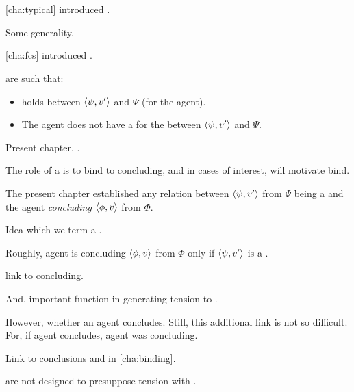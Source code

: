 \chapter{}
\label{cha:requs}

\begin{note}
  \autoref{cha:typical} introduced .

  Some generality.
\end{note}

\begin{note}
  \autoref{cha:fcs} introduced .

   are such that:
  \begin{itemize}
  \item
    \ros{} holds between \(\langle \psi, v' \rangle\) and \(\Psi\) (for the agent).
  \item
    The agent does not have a \wit{} for the \ros{} between \(\langle \psi, v' \rangle\) and \(\Psi\).
  \end{itemize}
\end{note}

\begin{note}
  Present chapter, .

  The role of a \requ{} is to bind \fc{} to concluding, and in cases of interest,  will motivate bind.
\end{note}

\begin{note}
  The present chapter established any relation between \(\langle \psi, v' \rangle\) from \(\Psi\) being a \fc{} and the agent \emph{concluding} \(\langle \phi, v \rangle\) from \(\Phi\).

  Idea which we term a \requ{}.

  Roughly, agent is concluding \(\langle \phi, v \rangle\) from \(\Phi\) only if \(\langle \psi, v' \rangle\) is a \fc{}.
\end{note}

\begin{note}
   link  to concluding.

  And, important function in generating tension to \issueConstraint{}.

  However, whether an agent concludes.
  Still, this additional link is not so difficult.
  For, if agent concludes, agent was concluding.

  Link  to conclusions and \issueConstraint{} in \autoref{cha:binding}.

   are not designed to presuppose tension with \issueConstraint{}.
\end{note}

